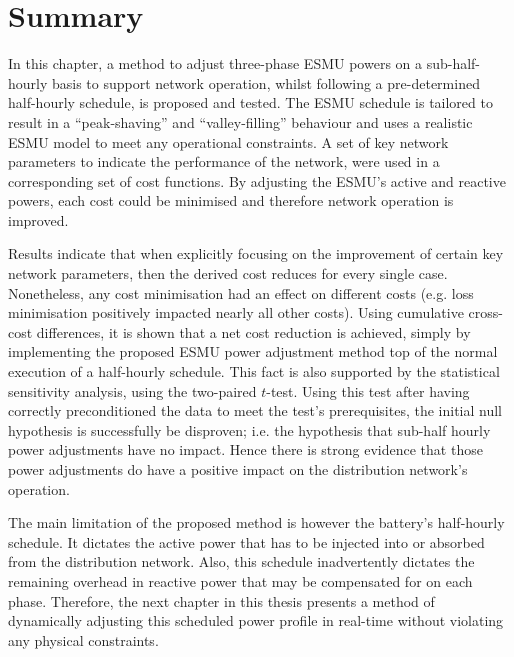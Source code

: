 \section{Summary}
\label{ch1:sec:summary}

In this chapter, a method to adjust three-phase ESMU powers on a sub-half-hourly basis to support network operation, whilst following a pre-determined half-hourly schedule, is proposed and tested.
The ESMU schedule is tailored to result in a ``peak-shaving'' and ``valley-filling'' behaviour and uses a realistic ESMU model to meet any operational constraints.
A set of key network parameters to indicate the performance of the network, were used in a corresponding set of cost functions.
By adjusting the ESMU's active and reactive powers, each cost could be minimised and therefore network operation is improved.

Results indicate that when explicitly focusing on the improvement of certain key network parameters, then the derived cost reduces for every single case.
Nonetheless, any cost minimisation had an effect on different costs (e.g. loss minimisation positively impacted nearly all other costs).
Using cumulative cross-cost differences, it is shown that a net cost reduction is achieved, simply by implementing the proposed ESMU power adjustment method top of the normal execution of a half-hourly schedule.
This fact is also supported by the statistical sensitivity analysis, using the two-paired $t$-test.
Using this test after having correctly preconditioned the data to meet the test's prerequisites, the initial null hypothesis is successfully be disproven; i.e. the hypothesis that sub-half hourly power adjustments have no impact.
Hence there is strong evidence that those power adjustments do have a positive impact on the distribution network's operation.

The main limitation of the proposed method is however the battery's half-hourly schedule.
It dictates the active power that has to be injected into or absorbed from the distribution network.
Also, this schedule inadvertently dictates the remaining overhead in reactive power that may be compensated for on each phase.
Therefore, the next chapter in this thesis presents a method of dynamically adjusting this scheduled power profile in real-time without violating any physical constraints.
